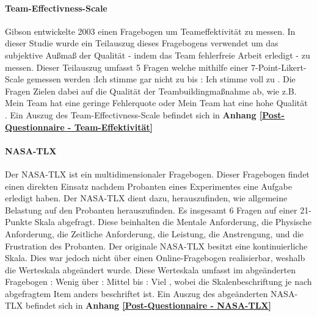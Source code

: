 \documentclass[a4paper,11pt]{article}%
\renewcommand{\\}{\vspace*{0.5\baselineskip} \newline}
\begin{document}
			\paragraph{Team-Effectivness-Scale}
Gibson \citep[p.469]{gibson2003team} entwickelte 2003 einen Fragebogen um Teameffektivität zu messen. In dieser Studie wurde ein Teilauszug dieses Fragebogens verwendet um das subjektive Außmaß der Qualität - indem das Team fehlerfreie Arbeit erledigt - zu messen. Dieser Teilauszug umfasst 5 Fragen welche mithilfe einer 7-Point-Likert-Scale gemessen werden :Ich stimme gar nicht zu \frqq bis : Ich stimme voll zu \frqq. Die Fragen Zielen dabei auf die Qualität der Teambuildingmaßnahme ab, wie z.B. \flqq Mein Team hat eine geringe Fehlerquote \frqq oder \flqq Mein Team hat eine hohe Qualität \frqq. 
\\Ein Auszug des Team-Effectivness-Scale befindet sich in \textbf{Anhang \ref{Post-Questionnaire - Team-Effektivität}}


		\paragraph{NASA-TLX}
Der NASA-TLX ist ein multidimensionaler Fragebogen. Dieser Fragebogen findet einen direkten Einsatz nachdem Probanten eines Experimentes eine Aufgabe erledigt haben. Der NASA-TLX dient dazu, herauszufinden, wie allgemeine Belastung auf den Probanten herauszufinden.
Es insgesamt 6 Fragen auf einer 21-Punkte Skala abgefragt. Diese beinhalten die Mentale Anforderung, die Physische Anforderung, die Zeitliche Anforderung, die Leistung, die Anstrengung, und die Frustration des Probanten. \cite{NASATLX}
Der originale NASA-TLX besitzt eine kontinuierliche Skala. Dies war jedoch nicht über einen Online-Fragebogen realisierbar, weshalb die Werteskala abgeändert wurde. Diese Werteskala umfasst im abgeänderten Fragebogen : Wenig \frqq über : Mittel \frqq bis : Viel \frqq, wobei die Skalenbeschriftung je nach abgefragtem Item anders beschriftet ist.
\\Ein Auszug des abgeänderten NASA-TLX befindet sich in \textbf{Anhang \ref{Post-Questionnaire - NASA-TLX}}
\end{document}
